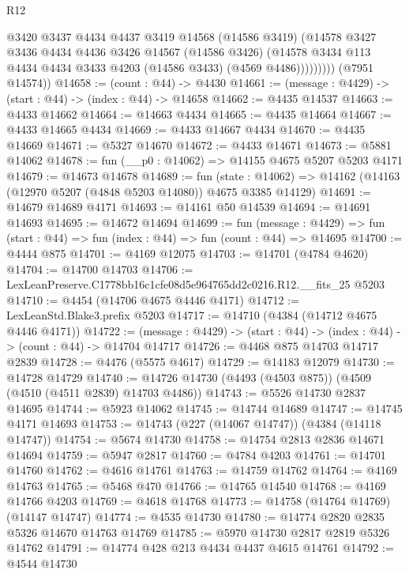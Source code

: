 \begin{lexlean}{R12}
\begin{coremodule}
                  @3420
                  @3437
                  @4434
                  @4437
                  @3419
                  @14568
                  (@14586 @3419)
                  (@14578
                    @3427
                    @3436
                    @4434
                    @4436
                    @3426
                    @14567
                    (@14586 @3426)
                    (@14578 @3434 @113 @4434 @4434 @3433 @4203 (@14586 @3433) (@4569 @4486)))))))))
      (@7951 @14574))
@14658 := (count : @44) -> @4430
@14661 := (message : @4429) -> (start : @44) -> (index : @44) -> @14658
@14662 := @4435 @14537
@14663 := @4433 @14662
@14664 := @14663 @4434
@14665 := @4435 @14664
@14667 := @4433 @14665 @4434
@14669 := @4433 @14667 @4434
@14670 := @4435 @14669
@14671 := @5327 @14670
@14672 := @4433 @14671
@14673 := @5881 @14062
@14678 := fun (__p0 : @14062) => @14155 @4675 @5207 @5203 @4171
@14679 := @14673 @14678
@14689 := fun (state : @14062) =>
  @14162 (@14163 (@12970 @5207 (@4848 @5203 @14080)) @4675 @3385 @14129)
@14691 := @14679 @14689 @4171
@14693 := @14161 @50 @14539
@14694 := @14691 @14693
@14695 := @14672 @14694
@14699 := fun (message : @4429) =>
  fun (start : @44) => fun (index : @44) => fun (count : @44) => @14695
@14700 := @4444 @875
@14701 := @4169 @12075
@14703 := @14701 (@4784 @4620)
@14704 := @14700 @14703
@14706 := LexLeanPreserve.C1778bb16c1cfe08d5e964765dd2c0216.R12.__fits_25 @5203
@14710 := @4454 (@14706 @4675 @4446 @4171)
@14712 := LexLeanStd.Blake3.prefix @5203
@14717 := @14710 (@4384 (@14712 @4675 @4446 @4171))
@14722 := (message : @4429) -> (start : @44) -> (index : @44) -> (count : @44) -> @14704 @14717
@14726 := @4468 @875 @14703 @14717 @2839
@14728 := @4476 (@5575 @4617)
@14729 := @14183 @12079
@14730 := @14728 @14729
@14740 := @14726 @14730 (@4493 (@4503 @875)) (@4509 (@4510 (@4511 @2839) @14703 @4486))
@14743 := @5526 @14730 @2837 @14695
@14744 := @5923 @14062
@14745 := @14744 @14689
@14747 := @14745 @4171 @14693
@14753 := @14743 (@227 (@14067 @14747)) (@4384 (@14118 @14747))
@14754 := @5674 @14730
@14758 := @14754 @2813 @2836 @14671 @14694
@14759 := @5947 @2817
@14760 := @4784 @4203
@14761 := @14701 @14760
@14762 := @4616 @14761
@14763 := @14759 @14762
@14764 := @4169 @14763
@14765 := @5468 @470
@14766 := @14765 @14540
@14768 := @4169 @14766 @4203
@14769 := @4618 @14768
@14773 := @14758 (@14764 @14769) (@14147 @14747)
@14774 := @4535 @14730
@14780 := @14774 @2820 @2835 @5326 @14670 @14763 @14769
@14785 := @5970 @14730 @2817 @2819 @5326 @14762
@14791 := @14774 @428 @213 @4434 @4437 @4615 @14761
@14792 := @4544 @14730

\end{coremodule}
\end{lexlean}
